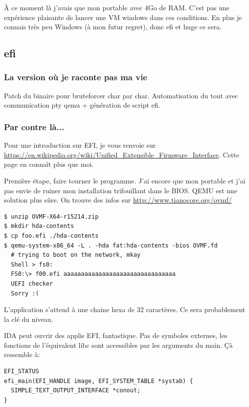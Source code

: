 \documentclass[14pt]{article}
\begin{document}
À ce moment là j'avais que mon portable avec 4Go de RAM. C'est pas une expérience plaisante de lancer une VM windows dans ces conditions. En plus je connais très peu Windows (à mon futur regret), donc efi et huge ce sera.


\FloatBarrier
\subsection{efi}
\subsubsection{La version où je raconte pas ma vie}
Patch du binaire pour bruteforcer char par char. Automatisation du tout avec communication pty qemu + génération de script efi.

\subsubsection{Par contre là...}
Pour une introduction sur EFI, je vous renvoie sur \url{https://en.wikipedia.org/wiki/Unified_Extensible_Firmware_Interface}. Cette page en connaît plus que moi.

Première étape, faire tourner le programme. J'ai encore que mon portable et j'ai pas envie de ruiner mon installation trifouillant dans le BIOS. QEMU est une solution plus sûre.
On trouve des infos sur \url{http://www.tianocore.org/ovmf/}

\begin{verbatim}
$ unzip OVMF-X64-r15214.zip 
$ mkdir hda-contents
$ cp foo.efi ./hda-contents
$ qemu-system-x86_64 -L . -hda fat:hda-contents -bios OVMF.fd
  # trying to boot on the network, mkay
  Shell > fs0:
  FS0:\> f00.efi aaaaaaaaaaaaaaaaaaaaaaaaaaaaaaaa 
  UEFI checker
  Sorry :(
\end{verbatim}

L'application s'attend à une chaine hexa de 32 caractères. Ce sera probablement la clé du niveau.

IDA peut ouvrir des applis EFI, fantastique. 
Pas de symboles externes, les fonctions de l'équivalent libc sont accessibles par les arguments du main.
Çà ressemble à:
\begin{verbatim}
EFI_STATUS
efi_main(EFI_HANDLE image, EFI_SYSTEM_TABLE *systab) {
  SIMPLE_TEXT_OUTPUT_INTERFACE *conout;
}
\end{verbatim}
\end{document}
